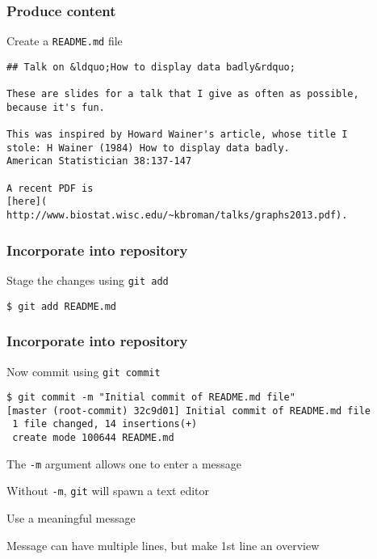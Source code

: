 \documentclass[aspectratio=169,12pt,t]{beamer}
\begin{document}
\begin{frame}[fragile]
\frametitle{Produce content}
\bbi
\item Create a {\tt README.md} file
\ei

\bigskip
\begin{lstlisting}
## Talk on &ldquo;How to display data badly&rdquo;

These are slides for a talk that I give as often as possible,
because it's fun.

This was inspired by Howard Wainer's article, whose title I
stole: H Wainer (1984) How to display data badly.
American Statistician 38:137-147

A recent PDF is
[here](
http://www.biostat.wisc.edu/~kbroman/talks/graphs2013.pdf).
\end{lstlisting}

\end{frame}


\begin{frame}[fragile]
\frametitle{Incorporate into repository}
\bbi
\item Stage the changes using {\tt \hilit git add}
\ei

\begin{lstlisting}
$ git add README.md
\end{lstlisting}

\end{frame}

\begin{frame}[fragile]
\frametitle{Incorporate into repository}
\bbi
\item Now commit using {\tt \hilit git commit}
\ei

\begin{lstlisting}
$ git commit -m "Initial commit of README.md file"
[master (root-commit) 32c9d01] Initial commit of README.md file
 1 file changed, 14 insertions(+)
 create mode 100644 README.md
\end{lstlisting}

\bi
\item The \texttt{-m} argument allows one to enter a message
\item Without \texttt{-m}, \texttt{git} will spawn a text editor
\item Use a meaningful message
\item Message can have multiple lines, but make 1st line an overview
\ei

\end{frame}
\end{document}
